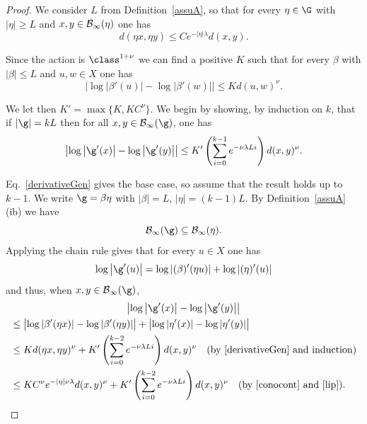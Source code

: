 \begin{proof}
We consider $L$ from Definition~\ref{assuA}, so that for every $\eta\in\G$ with $|\eta|\geq L$ and $x,y\in\cal B_\infty(\eta)$ one has
\begin{equation}\label{lip}
d(\eta x,\eta y)\leq Ce^{-|\eta|\lambda}d(x,y).
\end{equation}

Since the action is $\class^{1+\nu}$ we can find a positive $K$ such that for every $\beta$ with $|\beta|\leq L$ and $u,w\in X$ one has
\begin{equation}\label{derivativeGen}
\bigl\lvert\log\left|\beta'(u)\right|-\log\left|\beta'(w)\right|\bigr|\leq Kd(u,w)^\nu.
\end{equation}

We let then $K'=\max\{K,KC^\nu\}$. We begin by showing, by induction on $k$, that if $|\g|=kL$ then for all $x,y\in\cal B_\infty(\g)$, one has
\begin{equation}\label{induc}
\bigl\lvert\log\left|\g'(x)\right|-\log\left|\g'(y)\right|\bigr|\leq K'\left(\sum_{i=0}^{k-1}e^{-\nu\lambda L i}\right)d(x,y)^\nu.
\end{equation}

Eq.~\eqref{derivativeGen} gives the base case, so assume that the result holds up to $k-1$. We write $\g=\beta\eta$ with $|\beta|=L$, $|\eta|=(k-1)L$. By Definition~\ref{assuA} (ib) we have
\begin{equation}\label{conocont}
\cal B_\infty(\g)\subseteq\cal B_\infty(\eta).
\end{equation}
Applying the chain rule gives that for every $u\in X$ one has
\[
\log\left|\g'(u)\right|=\log\left|(\beta)'(\eta u)\right|+\log\left|(\eta)'(u)\right|
\]
and thus, when $x,y\in\cal B_\infty(\g)$,
\begin{multline*}
\bigl\lvert\log\left|\g'(x)\right|-\log\left|\g'(y)\right|\bigr\rvert\\
\begin{aligned}
& \leq \bigl\lvert\log\left|\beta'(\eta x)\right|-\log\left|\beta'(\eta y)\right|\bigr\rvert+\bigl|\log\left|\eta'(x)\right| -\log\left|\eta'(y)\right|\bigr|\\
& \leq K d(\eta x,\eta y)^\nu + K'\left(\sum_{i=0}^{k-2}e^{-\nu\lambda L i}\right)d(x,y)^\nu\quad (\text{by~\eqref{derivativeGen} and induction})\\
& \leq KC^\nu e^{-|\eta|\nu\lambda}d(x,y)^\nu+ K'\left(\sum_{i=0}^{k-2}e^{-\nu\lambda L i}\right)d(x,y)^\nu\quad (\text{by~\eqref{conocont} and~\eqref{lip}}).
\end{aligned}
\end{multline*}


\end{proof}

